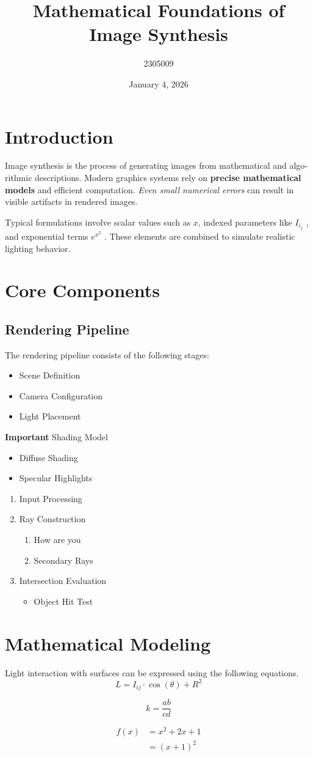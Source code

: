 \documentclass[]{article}
\title{Mathematical Foundations of Image Synthesis}
\author{2305009}
\date{January 4, 2026}
\begin{document}
\maketitle
\section{Introduction}
Image synthesis is the process of generating images from mathematical and algo-
rithmic descriptions. Modern graphics systems rely on 
\textbf{precise mathematical models}
 and efficient computation. \textit{Even small numerical errors} can result in
visible artifacts in rendered images.

Typical formulations involve scalar values such as $x$, indexed parameters
like $I_{i_j}$ , and exponential terms $e^{x^2}$
. These elements are combined to simulate
realistic lighting behavior.

\section{Core Components}
\subsection{Rendering Pipeline}
The rendering pipeline consists of the following stages:
\begin{itemize}
    \item Scene Definition
    \item Camera Configuration
    \item[-] Light Placement
\end{itemize}
\textbf{Important} Shading Model
\begin{itemize}
    \item[-]Diffuse Shading
    \item[-] Specular Highlights 
\end{itemize}
\begin{enumerate}
    \item Input Processing
    \item Ray Construction
         \begin{enumerate}
            \item How are you
            \item Secondary Rays
    \end{enumerate}
    \item Intersection Evaluation 
        \begin{itemize}
        \item Object Hit Test
        \end{itemize}
\end{enumerate}

\section{Mathematical Modeling}
Light interaction with surfaces can be expressed 
using the following equations.
\begin{equation}
L = I_{ij} \cdot \cos(\theta) + R^2 
\end{equation}

\[ k= \frac{ab}{cd} \]

\begin{align}
    f(x) &= x^2 + 2x + 1 \nonumber \\
    &= (x+1)^2
\end{align}
\end{document}

